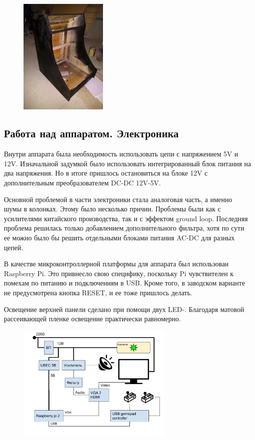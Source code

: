 \documentclass[10pt, a5paper]{article}
\begin{document}
\begin{figure}[h!]
  \centering
  \includegraphics[height=5.7cm]{27_2016_Sorokin3.png}
\end{figure}


\subsection*{Работа над аппаратом. Электроника}

Внутри аппарата была необходимость использовать цепи с напряжением 5V и 12V. Изначальной задумкой было использовать интегрированный блок питания на два напряжения. Но в итоге пришлось остановиться на блоке 12V с дополнительным преобразователем DC-DC 12V-5V.

Основной проблемой в части электроники стала аналоговая \linebreak часть, а именно шумы в колонках. Этому было несколько причин.
Проблемы были как с усилителями китайского производства, так и с эффектом ground loop. Последняя проблема решилась только добавлением дополнительного фильтра, хотя по сути ее можно было бы решить отдельными блоками питания AC-DC для разных цепей.

В качестве микроконтроллерной платформы для аппарата был использован Raspberry Pi. Это привнесло свою специфику, поскольку Pi чувствителен к помехам по питанию и подключениям в USB. Кроме того, в заводском варианте не предусмотрена кнопка RESET, и ее тоже пришлось делать.

Освещение верхней панели сделано при помощи двух LED-. Благодаря матовой рассеивающей пленке освещение практически равномерно.

\begin{figure}[h!]
  \centering
  \includegraphics[height=5.7cm]{27_2016_Sorokin1.pdf}
\end{figure}
\end{document}
